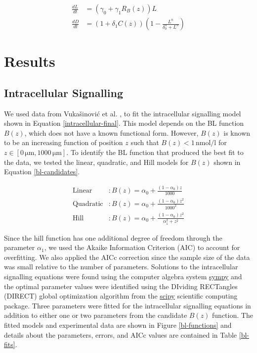 \documentclass[referee,pdflatex,sn-mathphys-num]{sn-jnl}
\newcommand{\um}{\,\unit{\micro\metre}}
\newcommand{\nm}{\,\unit{\nano\mole\per\litre}}
\begin{document}
\begin{equation}
\label{extracellular-final}
\begin{aligned}
  \frac{ dL }{ dt } &= \left(\gamma_{0} + \gamma_{1}R_{B}(z)\right)L  \\[5pt]
\frac{ dD }{ dt } &= (1 + \delta_{1}C(z))\left( 1 - \frac{ L^{ n } }{ \delta_{0}^{ n } + L^{ n } } \right) 
\end{aligned}
\end{equation}

\section*{Results}\label{sec2}

\subsection*{Intracellular Signalling}\label{sec21}

We used data from Vukašinović et al. \cite{vukasinovic2021}, to fit the intracellular signalling model shown in Equation \ref{intracellular-final}. 
This model depends on the BL function $B(z)$, which does not have a known functional form.
However, $B(z)$ is known to be an increasing function of position $z$ \cite{vukasinovic2021} such that $B(z) < 1\nm$ \cite{vanesse2012} for $z \in [0\um, 1000\um]$.
To identify the BL function that produced the best fit to the data, we tested the linear, quadratic, and Hill models for $B(z)$ shown in Equation \ref{bl-candidates}.

\begin{equation}
\label{bl-candidates}
\begin{aligned}
  \text{Linear}&: B(z) = \alpha_{0} + \frac{(1 - \alpha_{0})z}{1000} \\[5pt]
  \text{Quadratic}&: B(z) = \alpha_{0} + \frac{(1 - \alpha_{0})z^{2}}{1000^{2}} \\[5pt]
  \text{Hill}&: B(z) = \alpha_{0} + \frac{(1 - \alpha_{0})z^{2}}{\alpha_{1}^{2} + z^{2}}
\end{aligned}
\end{equation}

Since the hill function has one additional degree of freedom through the parameter $\alpha_{1}$, we used the Akaike Information Criterion (AIC) \cite{akaike1974} to account for overfitting.
We also applied the AICc correction \cite{sugiura1978} since the sample size of the data was small relative to the number of parameters.
Solutions to the intracellular signalling equations were found using the computer algebra system \href{https://www.sympy.org/en/index.html}{sympy} and the optimal parameter values were identified using the DIviding RECTangles (DIRECT) global optimization algorithm \cite{jones1993} from the \href{https://docs.scipy.org/doc/scipy/reference/generated/scipy.optimize.direct.html}{scipy} scientific computing package.
Three parameters were fitted for the intracellular signalling equations in addition to either one or two parameters from the candidate $B(z)$ function.
The fitted models and experimental data are shown in Figure \ref{bl-functions} and details about the parameters, errors, and AICc values are contained in Table \ref{bl-fits}.
\end{document}
